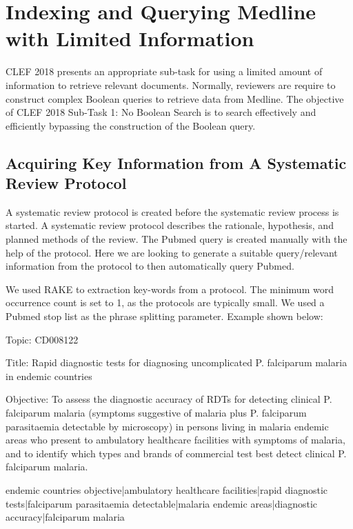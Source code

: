 \section{Indexing and Querying Medline with Limited Information}

CLEF 2018 \cite{CLEFLINK} presents an appropriate sub-task for using a limited amount of information to retrieve relevant documents. Normally, reviewers are require to construct complex Boolean queries to retrieve data from Medline. The objective of CLEF 2018 Sub-Task 1: No Boolean Search \cite{CLEFLINK} is to search effectively and efficiently bypassing the construction of the Boolean query.

\subsection{Acquiring Key Information from A Systematic Review Protocol}

A systematic review protocol is created before the systematic review process is started. A systematic review protocol describes the rationale, hypothesis, and planned methods of the review. The Pubmed query is created manually with the help of the protocol. Here we are looking to generate a suitable query/relevant information from the protocol to then automatically query Pubmed.

We used RAKE \cite{rake} to extraction key-words from a protocol. The minimum word occurrence count is set to 1, as the protocols are typically small. We used a Pubmed stop list as the phrase splitting parameter. Example shown below:

\begin{tcolorbox}

Topic: CD008122 

Title: Rapid diagnostic tests for diagnosing uncomplicated P. falciparum malaria in endemic countries 

Objective: To assess the diagnostic accuracy of RDTs for detecting clinical P. falciparum malaria (symptoms suggestive of malaria plus P. falciparum parasitaemia detectable by microscopy) in persons living in malaria endemic areas who present to ambulatory healthcare facilities with symptoms of malaria, and to identify which types and brands of commercial test best detect clinical P. falciparum malaria.

\end{tcolorbox}

 
 
\begin{tcolorbox}

endemic countries objective|ambulatory healthcare facilities|rapid diagnostic tests|falciparum parasitaemia detectable|malaria endemic areas|diagnostic accuracy|falciparum malaria

\end{tcolorbox}

